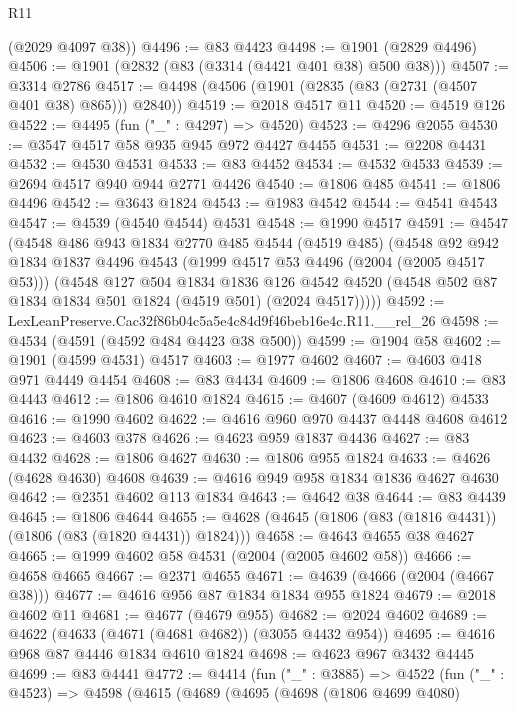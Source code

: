 \begin{lexlean}{R11}
\begin{coremodule}
      (@2029 @4097 @38))
@4496 := @83 @4423
@4498 := @1901 (@2829 @4496)
@4506 := @1901 (@2832 (@83 (@3314 (@4421 @401 @38) @500 @38)))
@4507 := @3314 @2786
@4517 := @4498 (@4506 (@1901 (@2835 (@83 (@2731 (@4507 @401 @38) @865))) @2840))
@4519 := @2018 @4517 @11
@4520 := @4519 @126
@4522 := @4495 (fun ("_" : @4297) => @4520)
@4523 := @4296 @2055
@4530 := @3547 @4517 @58 @935 @945 @972 @4427 @4455
@4531 := @2208 @4431
@4532 := @4530 @4531
@4533 := @83 @4452
@4534 := @4532 @4533
@4539 := @2694 @4517 @940 @944 @2771 @4426
@4540 := @1806 @485
@4541 := @1806 @4496
@4542 := @3643 @1824
@4543 := @1983 @4542
@4544 := @4541 @4543
@4547 := @4539 (@4540 @4544) @4531
@4548 := @1990 @4517
@4591 := @4547
    (@4548
      @486
      @943
      @1834
      @2770
      @485
      @4544
      (@4519 @485)
      (@4548
        @92
        @942
        @1834
        @1837
        @4496
        @4543
        (@1999 @4517 @53 @4496 (@2004 (@2005 @4517 @53)))
        (@4548
          @127
          @504
          @1834
          @1836
          @126
          @4542
          @4520
          (@4548 @502 @87 @1834 @1834 @501 @1824 (@4519 @501) (@2024 @4517)))))
@4592 := LexLeanPreserve.Cac32f86b04c5a5e4c84d9f46beb16e4c.R11.__rel_26
@4598 := @4534 (@4591 (@4592 @484 @4423 @38 @500))
@4599 := @1904 @58
@4602 := @1901 (@4599 @4531) @4517
@4603 := @1977 @4602
@4607 := @4603 @418 @971 @4449 @4454
@4608 := @83 @4434
@4609 := @1806 @4608
@4610 := @83 @4443
@4612 := @1806 @4610 @1824
@4615 := @4607 (@4609 @4612) @4533
@4616 := @1990 @4602
@4622 := @4616 @960 @970 @4437 @4448 @4608 @4612
@4623 := @4603 @378
@4626 := @4623 @959 @1837 @4436
@4627 := @83 @4432
@4628 := @1806 @4627
@4630 := @1806 @955 @1824
@4633 := @4626 (@4628 @4630) @4608
@4639 := @4616 @949 @958 @1834 @1836 @4627 @4630
@4642 := @2351 @4602 @113 @1834
@4643 := @4642 @38
@4644 := @83 @4439
@4645 := @1806 @4644
@4655 := @4628 (@4645 (@1806 (@83 (@1816 @4431)) (@1806 (@83 (@1820 @4431)) @1824)))
@4658 := @4643 @4655 @38 @4627
@4665 := @1999 @4602 @58 @4531 (@2004 (@2005 @4602 @58))
@4666 := @4658 @4665
@4667 := @2371 @4655
@4671 := @4639 (@4666 (@2004 (@4667 @38)))
@4677 := @4616 @956 @87 @1834 @1834 @955 @1824
@4679 := @2018 @4602 @11
@4681 := @4677 (@4679 @955)
@4682 := @2024 @4602
@4689 := @4622 (@4633 (@4671 (@4681 @4682)) (@3055 @4432 @954))
@4695 := @4616 @968 @87 @4446 @1834 @4610 @1824
@4698 := @4623 @967 @3432 @4445
@4699 := @83 @4441
@4772 := @4414
    (fun ("_" : @3885) =>
    @4522
      (fun ("_" : @4523) =>
      @4598
        (@4615
          (@4689
            (@4695
              (@4698
                (@1806 @4699 @4080)

\end{coremodule}
\end{lexlean}
